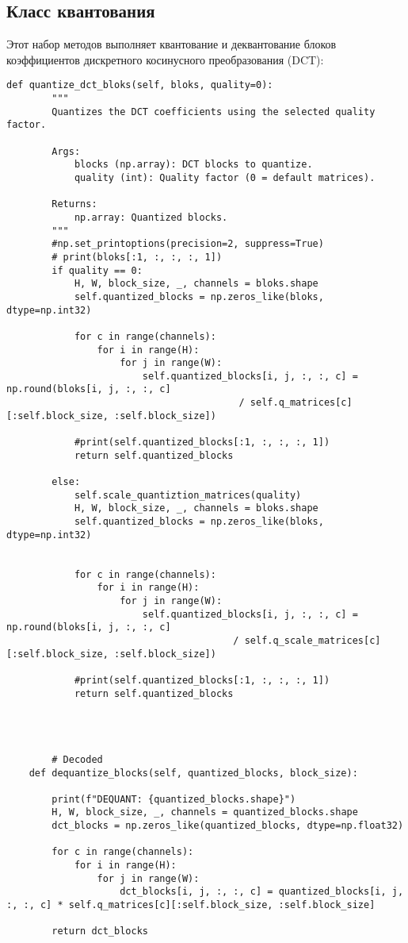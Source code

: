 \subsection{Класс квантования}


Этот набор методов выполняет квантование и деквантование блоков коэффициентов дискретного косинусного 
преобразования (DCT):

\begin{lstlisting}[caption={Класс квантования коэффициентов}]
        def quantize_dct_bloks(self, bloks, quality=0):
        """
        Quantizes the DCT coefficients using the selected quality factor.
        
        Args:
            blocks (np.array): DCT blocks to quantize.
            quality (int): Quality factor (0 = default matrices).
        
        Returns:
            np.array: Quantized blocks.
        """
        #np.set_printoptions(precision=2, suppress=True)
        # print(bloks[:1, :, :, :, 1])
        if quality == 0:
            H, W, block_size, _, channels = bloks.shape
            self.quantized_blocks = np.zeros_like(bloks, dtype=np.int32)

            for c in range(channels):
                for i in range(H):
                    for j in range(W):
                        self.quantized_blocks[i, j, :, :, c] = np.round(bloks[i, j, :, :, c]
                                         / self.q_matrices[c][:self.block_size, :self.block_size])

            #print(self.quantized_blocks[:1, :, :, :, 1])
            return self.quantized_blocks
        
        else:
            self.scale_quantiztion_matrices(quality)
            H, W, block_size, _, channels = bloks.shape
            self.quantized_blocks = np.zeros_like(bloks, dtype=np.int32)


            for c in range(channels):
                for i in range(H):
                    for j in range(W):
                        self.quantized_blocks[i, j, :, :, c] = np.round(bloks[i, j, :, :, c] 
                                        / self.q_scale_matrices[c][:self.block_size, :self.block_size])

            #print(self.quantized_blocks[:1, :, :, :, 1])
            return self.quantized_blocks
        



        # Decoded
    def dequantize_blocks(self, quantized_blocks, block_size):

        print(f"DEQUANT: {quantized_blocks.shape}")
        H, W, block_size, _, channels = quantized_blocks.shape
        dct_blocks = np.zeros_like(quantized_blocks, dtype=np.float32)

        for c in range(channels):
            for i in range(H):
                for j in range(W):
                    dct_blocks[i, j, :, :, c] = quantized_blocks[i, j, :, :, c] * self.q_matrices[c][:self.block_size, :self.block_size]

        return dct_blocks
\end{lstlisting}




